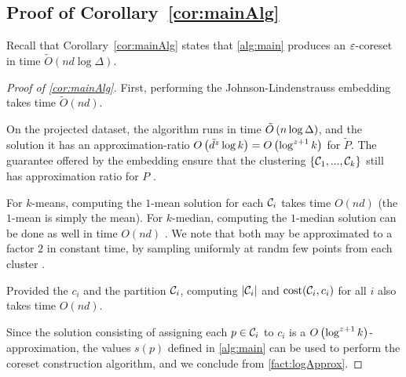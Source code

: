 \subsection{Proof of Corollary~\ref{cor:mainAlg}}
\label{ssec:cor_proof}
Recall that Corollary~\ref{cor:mainAlg} states that \cref{alg:main} produces an $\varepsilon$-coreset in time $\tilde O(nd \log \Delta)$.
\begin{proof}[Proof of \cref{cor:mainAlg}]
First, performing the Johnson-Lindenstrauss embedding takes time $\tilde O(nd)$.

On the projected dataset, the algorithm \fkmeans runs in time $\tilde O\left( n \log \Delta\right)$, and the solution it has an approximation-ratio $O\left( \tilde{d}^z \log k\right) = O\left(\log^{z+1} k\right)$ for $\tilde P$. 
The guarantee offered by the embedding ensure that the clustering $\left\{ \mathcal C_1,...,\mathcal C_k\right\}$ still has approximation ratio for $P$ \cite{makarychev2019performance}. 

For $k$-means, computing the $1$-mean solution for each $\mathcal C_i$ takes time $O(nd)$ (the $1$-mean is simply the mean). 
For $k$-median, computing the $1$-median solution can be done as well in time $O(nd)$ \cite{CohenLMPS16}. 
We note that both may be approximated to a factor $2$ in constant time, by sampling uniformly at randm few points from each cluster \cite{neurips21}.

Provided the $c_i$ and the partition $\mathcal C_i$, computing $|\mathcal C_i|$ and $\operatorname{cost}(\mathcal C_i, c_i)$ for all $i$ also takes time $O(nd)$.

Since the solution consisting of assigning each $p \in \mathcal C_i$ to $c_i$ is a $O\left( \log^{z+1} k\right)$-approximation, the values $s(p)$ defined in \cref{alg:main} can be used to perform the coreset construction algorithm, and we conclude from \cref{fact:logApprox}.
\end{proof}


